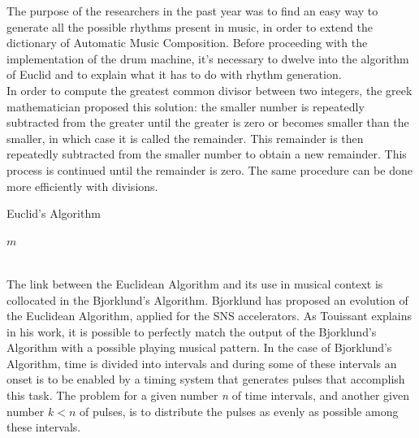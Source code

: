 \documentclass[main.tex]{subfiles}
\begin{document}
The purpose of the researchers in the past year was to find an easy way to generate all the possible rhythms present in music, in order to extend the dictionary of Automatic Music Composition\cite{Allouche:2002:AutomSeq:book}.
Before proceeding with the implementation of the drum machine, it’s necessary to dwelve into the algorithm of Euclid and to explain what it has to do with rhythm generation.\\
In order to compute the greatest common divisor between two integers, the greek mathematician proposed this solution: the smaller number is repeatedly subtracted from the greater until the greater is zero or becomes smaller than the smaller, in which case it is called the remainder. This remainder is then repeatedly subtracted from the smaller number to obtain a new remainder. This process is continued until the remainder is zero\cite{Euclid:Elements}. 
The same procedure can be done more efficiently with divisions.\\
\begin{algorithm}
\caption{Euclid's Algorithm}\label{euclid}
\begin{algorithmic}[1]
\State \Return $m$
\Else
\State {}

\EndIf
\EndProcedure
\end{algorithmic}
\end{algorithm}
\\
[10mm]
The link between the Euclidean Algorithm and its use in musical context is collocated in the Bjorklund's Algorithm. Bjorklund has proposed an evolution of the Euclidean Algorithm, applied for the SNS accelerators\cite{Bjorklund:2003:euclidean:rhythm}. As Touissant explains in his work\cite{Toussaint:2004:euclidean:rhythm}, it is possible to perfectly match the output of the Bjorklund's Algorithm with a possible playing musical pattern.
In the case of Bjorklund's Algorithm, time is divided into intervals and during some of these intervals an onset is to be enabled by a timing system that generates pulses that accomplish this task. The problem for a given number \textit{n} of time intervals, and another given number \begin{math}k<n\end{math} of pulses, is to distribute the pulses as evenly as possible among these intervals.\\
\end{document}
